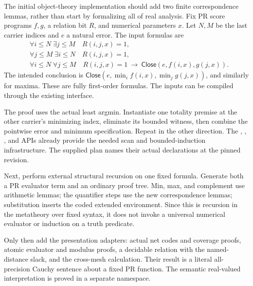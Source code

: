 The initial object-theory implementation should add two finite correspondence lemmas, rather than start by formalizing all of real analysis. Fix PR score programs \(f,g\), a relation bit \(R\), and numerical parameters \(x\). Let \(N,M\) be the last carrier indices and \(e\) a natural error. The input formulas are
\begin{align*}
 &\forall i\leq N\;\exists j\leq M\quad R(i,j,x)=1,\\
 &\forall j\leq M\;\exists i\leq N\quad R(i,j,x)=1,\\
 &\forall i\leq N\;\forall j\leq M\quad
 R(i,j,x)=1\ \longrightarrow\ \mathsf{Close}(e,f(i,x),g(j,x)).
\end{align*}
The intended conclusion is \(\mathsf{Close}(e,\min_i f(i,x),\min_jg(j,x))\), and similarly for maxima. These are fully first-order formulas. The inputs can be compiled through the existing  interface.

The proof uses the actual least argmin. Instantiate one totality premise at the other carrier's minimizing index, eliminate its bounded witness, then combine the pointwise error and minimum specification. Repeat in the other direction. The , , , and  APIs already provide the needed scan and bounded-induction infrastructure. The supplied plan names their actual declarations at the pinned revision.

Next, perform external structural recursion on one fixed formula. Generate both a PR evaluator term and an ordinary proof tree. Min, max, and complement use arithmetic lemmas; the quantifier steps use the new correspondence lemmas; substitution inserts the coded extended environment. Since this is recursion in the metatheory over fixed syntax, it does not invoke a universal numerical evaluator or induction on a truth predicate.

Only then add the presentation adapters: actual net codes and coverage proofs, atomic evaluator and modulus proofs, a decidable relation with the named-distance slack, and the cross-mesh calculation. Their result is a literal all-precision Cauchy sentence about a fixed PR function. The semantic real-valued interpretation is proved in a separate namespace.

